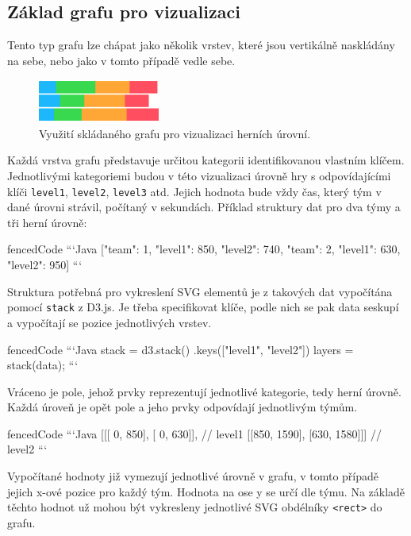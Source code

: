 \documentclass[
  digital, %
  oneside, %
  table,   %
  nolof,     %
  nolot,     %
]{fithesis3}
\begin{document}
\subsection{Základ grafu pro vizualizaci} \label{chartBase}
Tento typ grafu lze chápat jako několik vrstev, které jsou vertikálně naskládány na sebe, nebo jako v tomto případě vedle sebe.
\begin{figure}[H]
  \begin{center}
    \includegraphics[width=4cm]{images/stack-ctf.pdf}
  \end{center}
  \caption{Využití skládaného grafu pro vizualizaci herních úrovní.}
  \label{fig:visualizationChart}
\end{figure}
Každá vrstva grafu představuje určitou kategorii identifikovanou vlastním klíčem. Jednotlivými kategoriemi budou v této vizualizaci úrovně hry s odpovídajícími klíči \verb|level1|, \verb|level2|, \verb|level3| atd. Jejich hodnota bude vždy čas, který tým v dané úrovni strávil, počítaný v sekundách. Příklad struktury dat pro dva týmy a tři herní úrovně:
\begin{markdown*}{
  fencedCode
}
```Java
	[{"team": 1, "level1": 850, "level2": 740},
	 {"team": 2, "level1": 630, "level2": 950}]
```
\end{markdown*}

Struktura potřebná pro vykreslení SVG elementů je z takových dat vypočítána pomocí \verb|stack| z D3.js. Je třeba specifikovat klíče, podle nich se pak data seskupí a vypočítají se pozice jednotlivých vrstev.

\begin{markdown*}{
  fencedCode
}
```Java
	stack = d3.stack()
			  .keys(["level1", "level2"])
	layers = stack(data);
```
\end{markdown*}
Vráceno je pole, jehož prvky reprezentují jednotlivé kategorie, tedy herní úrovně. Každá úroveň je opět pole a jeho prvky odpovídají jednotlivým týmům.
\begin{markdown*}{
  fencedCode
}
```Java
	[[[   0, 850], [   0, 630]],     // level1
	  [[850, 1590], [630, 1580]]]    // level2
```
\end{markdown*}
Vypočítané hodnoty již vymezují jednotlivé úrovně v grafu, v tomto případě jejich \mbox{x-ové} pozice pro každý tým. Hodnota na ose y se určí dle týmu. Na základě těchto hodnot už mohou být vykresleny jednotlivé SVG obdélníky \verb|<rect>| do grafu.
\end{document}
